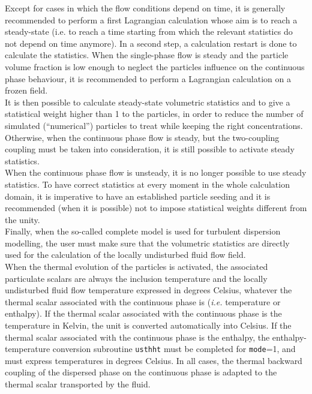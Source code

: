 {{{Except for cases in which the flow conditions depend on time, it is generally recommended to perform a first Lagrangian calculation whose aim is to reach a steady-state (i.e. to reach a time starting from which the relevant statistics do not depend on time anymore). In a second step, a calculation restart is done to calculate the statistics. When the single-phase flow is steady and the particle volume fraction is low enough to neglect the particles influence on the continuous phase behaviour, it is recommended to perform a Lagrangian calculation on a frozen field.\\

It is then possible to calculate steady-state volumetric statistics and to give a statistical weight higher than 1 to the particles, in order to reduce the number of simulated (``numerical'') particles to treat while keeping the right concentrations. Otherwise, when the continuous phase flow is steady, but the two-coupling coupling must be taken into consideration, it is still possible to activate steady statistics. \\
When the continuous phase flow is unsteady, it is no longer possible to use steady statistics. To have correct statistics at every moment in the whole calculation domain, it is imperative to have an established particle seeding and it is recommended (when it is possible) not to impose statistical weights different from the unity. \\

Finally, when the so-called complete model is used for turbulent dispersion modelling, the user must make sure that the volumetric statistics are directly used for the calculation of the locally undisturbed fluid flow field.\\

When the thermal evolution of the particles is activated, the associated particulate scalars are always the inclusion temperature and the locally undisturbed fluid flow temperature expressed in degrees Celsius, whatever the thermal scalar associated with the continuous phase is ({\em i.e.} temperature or enthalpy). If the
thermal scalar associated with the continuous phase is the temperature in Kelvin, the unit is converted automatically into Celsius. If the thermal scalar associated with the continuous phase is the enthalpy, the enthalpy-temperature conversion subroutine \texttt{usthht} must be completed for \texttt{mode}=1, and must express temperatures in degrees Celsius. In all cases, the thermal backward coupling of the dispersed phase on the continuous phase is adapted to the thermal scalar transported by the fluid.


}}}
